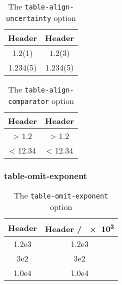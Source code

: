 \documentclass{article}
\begin{document}
\begin{table}[H]
\centering
\caption{The \texttt{table-align-uncertainty} option}
\label{tab:align:uncert}
\begin{tabular}{SS[table-align-uncertainty = false]}
\toprule
{Header} & {Header} \\
(1) & 1.2(3) \\
1.234(5) & 1.234(5) \\
\bottomrule
\end{tabular}
\end{table}

\begin{table}[H]
\centering
\caption{The \texttt{table-align-comparator} option}
\label{tab:align:comp}
\begin{tabular}{SS[table-align-comparator = false]}
\toprule
{Header} & {Header} \\
\midrule
> 1.2 & > 1.2 \\
< 12.34 & < 12.34 \\
\bottomrule
\end{tabular}
\end{table}

\subsubsection{table-omit-exponent}
\begin{table}[H]
\centering
\caption{The \texttt{table-omit-exponent} option}
\label{tab:exp:omit}
\begin{tabular}{
S[table-format = 1.1e1]
S[fixed-exponent = 3, table-format = 2.1, table-omit-exponent]
}
\toprule
{Header} & {Header / \num{e3}} \\
\midrule
1.2e3 & 1.2e3 \\
3e2 & 3e2 \\
1.0e4 & 1.0e4 \\
\bottomrule
\end{tabular}
\end{table}
\end{document}

